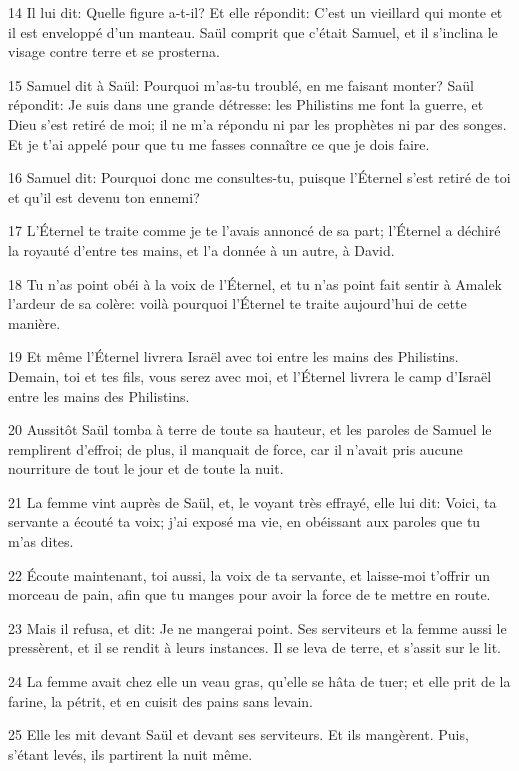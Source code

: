 \par 14 Il lui dit: Quelle figure a-t-il? Et elle répondit: C'est un vieillard qui monte et il est enveloppé d'un manteau. Saül comprit que c'était Samuel, et il s'inclina le visage contre terre et se prosterna.
\par 15 Samuel dit à Saül: Pourquoi m'as-tu troublé, en me faisant monter? Saül répondit: Je suis dans une grande détresse: les Philistins me font la guerre, et Dieu s'est retiré de moi; il ne m'a répondu ni par les prophètes ni par des songes. Et je t'ai appelé pour que tu me fasses connaître ce que je dois faire.
\par 16 Samuel dit: Pourquoi donc me consultes-tu, puisque l'Éternel s'est retiré de toi et qu'il est devenu ton ennemi?
\par 17 L'Éternel te traite comme je te l'avais annoncé de sa part; l'Éternel a déchiré la royauté d'entre tes mains, et l'a donnée à un autre, à David.
\par 18 Tu n'as point obéi à la voix de l'Éternel, et tu n'as point fait sentir à Amalek l'ardeur de sa colère: voilà pourquoi l'Éternel te traite aujourd'hui de cette manière.
\par 19 Et même l'Éternel livrera Israël avec toi entre les mains des Philistins. Demain, toi et tes fils, vous serez avec moi, et l'Éternel livrera le camp d'Israël entre les mains des Philistins.
\par 20 Aussitôt Saül tomba à terre de toute sa hauteur, et les paroles de Samuel le remplirent d'effroi; de plus, il manquait de force, car il n'avait pris aucune nourriture de tout le jour et de toute la nuit.
\par 21 La femme vint auprès de Saül, et, le voyant très effrayé, elle lui dit: Voici, ta servante a écouté ta voix; j'ai exposé ma vie, en obéissant aux paroles que tu m'as dites.
\par 22 Écoute maintenant, toi aussi, la voix de ta servante, et laisse-moi t'offrir un morceau de pain, afin que tu manges pour avoir la force de te mettre en route.
\par 23 Mais il refusa, et dit: Je ne mangerai point. Ses serviteurs et la femme aussi le pressèrent, et il se rendit à leurs instances. Il se leva de terre, et s'assit sur le lit.
\par 24 La femme avait chez elle un veau gras, qu'elle se hâta de tuer; et elle prit de la farine, la pétrit, et en cuisit des pains sans levain.
\par 25 Elle les mit devant Saül et devant ses serviteurs. Et ils mangèrent. Puis, s'étant levés, ils partirent la nuit même.


